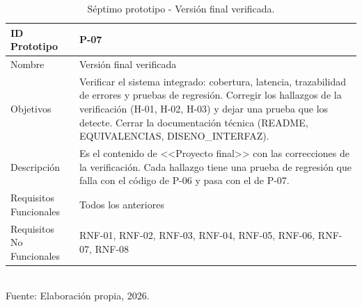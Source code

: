 \begin{table}[h!]
\centering
\caption{Séptimo prototipo - Versión final verificada.}
\label{tab:prototipo-p07}
\begin{tabularx}{\textwidth}{|l|X|}
\hline
ID Prototipo & P-07 \\ \hline
Nombre & Versión final verificada \\ \hline
Objetivos & Verificar el sistema integrado: cobertura, latencia, trazabilidad de errores y pruebas de regresión. \newline Corregir los hallazgos de la verificación (H-01, H-02, H-03) y dejar una prueba que los detecte. \newline Cerrar la documentación técnica (README, EQUIVALENCIAS, DISENO\_INTERFAZ). \\ \hline
Descripción & Es el contenido de <<Proyecto final>> con las correcciones de la verificación. Cada hallazgo tiene una prueba de regresión que falla con el código de P-06 y pasa con el de P-07. \\ \hline
Requisitos Funcionales & Todos los anteriores \\ \hline
Requisitos No Funcionales & RNF-01, RNF-02, RNF-03, RNF-04, RNF-05, RNF-06, RNF-07, RNF-08 \\ \hline
\end{tabularx}
\\[2pt] {\small Fuente: Elaboración propia, 2026.}
\end{table}

